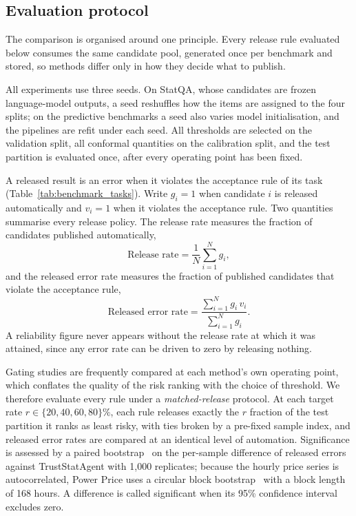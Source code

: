 \documentclass[preprint,12pt,authoryear]{elsarticle}
\begin{document}
\subsection{Evaluation protocol}
\label{sec:evaluation_protocol}


The comparison is organised around one principle. Every release rule evaluated below consumes the same candidate pool, generated once per benchmark and stored, so methods differ only in how they decide what to publish.

All experiments use three seeds. On StatQA, whose candidates are frozen language-model outputs, a seed reshuffles how the items are assigned to the four splits; on the predictive benchmarks a seed also varies model initialisation, and the pipelines are refit under each seed.
All thresholds are selected on the validation split, all conformal quantities on the calibration split, and the test partition is evaluated once, after every operating point has been fixed.

A released result is an error when it violates the acceptance rule of its task (Table~\ref{tab:benchmark_tasks}).
Write $g_i = 1$ when candidate $i$ is released automatically and $v_i = 1$ when it violates the acceptance rule.
Two quantities summarise every release policy.
The release rate measures the fraction of candidates published automatically,
\begin{equation}
    \text{Release rate}
    =
    \frac{1}{N}\sum_{i=1}^{N} g_i,
    \label{eq:exp_release_rate}
\end{equation}
and the released error rate measures the fraction of published candidates that violate the acceptance rule,
\begin{equation}
    \text{Released error rate}
    =
    \frac{\sum_{i=1}^{N} g_i\, v_i}
         {\sum_{i=1}^{N} g_i}.
    \label{eq:exp_released_error_rate}
\end{equation}
A reliability figure never appears without the release rate at which it was attained, since any error rate can be driven to zero by releasing nothing.

Gating studies are frequently compared at each method's own operating point, which conflates the quality of the risk ranking with the choice of threshold.
We therefore evaluate every rule under a \emph{matched-release} protocol. At each target rate $r\in\{20,40,60,80\}\%$, each rule releases exactly the $r$ fraction of the test partition it ranks as least risky, with ties broken by a pre-fixed sample index, and released error rates are compared at an identical level of automation.
Significance is assessed by a paired bootstrap~\citep{efron1993introduction} on the per-sample difference of released errors against TrustStatAgent with 1{,}000 replicates; because the hourly price series is autocorrelated, Power Price uses a circular block bootstrap~\citep{politis1992circular} with a block length of 168 hours.
A difference is called significant when its 95\% confidence interval excludes zero.
\end{document}
